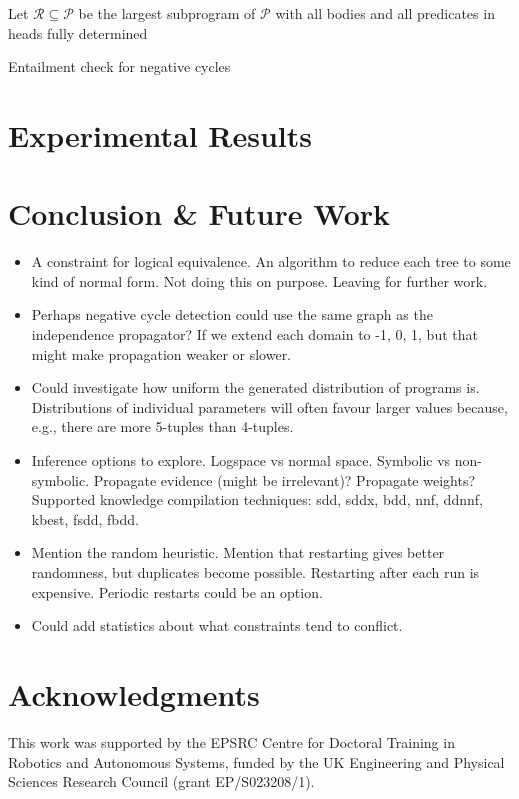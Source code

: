 \documentclass[runningheads]{llncs}
\begin{document}
\begin{algorithm}[t]
  Let $\mathscr{R} \subseteq \mathscr{P}$ be the largest subprogram of
  $\mathscr{P}$ with all bodies and all predicates in heads fully
  determined\footnotemark\;
  \;
  \caption{Entailment check for negative cycles}
\end{algorithm}

\section{Experimental Results}

\section{Conclusion \& Future Work}

\begin{itemize}
\item A constraint for logical equivalence. An algorithm to reduce each tree to
  some kind of normal form. Not doing this on purpose. Leaving for further work.
\item Perhaps negative cycle detection could use the same graph as the
  independence propagator? If we extend each domain to {-1, 0, 1}, but that
  might make propagation weaker or slower.
\item Could investigate how uniform the generated distribution of programs is.
  Distributions of individual parameters will often favour larger values
  because, e.g., there are more 5-tuples than 4-tuples.
\item Inference options to explore. Logspace vs normal space. Symbolic vs
  non-symbolic. Propagate evidence (might be irrelevant)? Propagate weights?
  Supported knowledge compilation techniques: sdd, sddx, bdd, nnf, ddnnf, kbest,
  fsdd, fbdd.
\item Mention the random heuristic. Mention that restarting gives better
  randomness, but duplicates become possible. Restarting after each run is
  expensive. Periodic restarts could be an option.
\item Could add statistics about what constraints tend to conflict.
\end{itemize}

\section*{Acknowledgments}

This work was supported by the EPSRC Centre for Doctoral Training in Robotics
and Autonomous Systems, funded by the UK Engineering and Physical Sciences
Research Council (grant EP/S023208/1).



\end{document}
